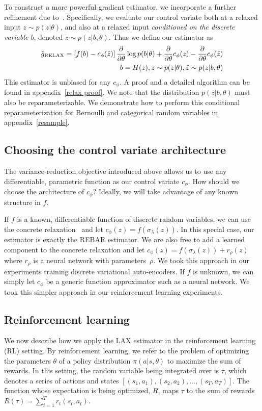 \documentclass{article}
\newcommand{\PT}{\frac{\partial}{\partial \theta}}
\newcommand{\LAX}{{\textnormal{LAX}}}
\begin{document}
To construct a more powerful gradient estimator, we incorporate a further refinement due to~\cite{tucker2017rebar}.
Specifically, we evaluate our control variate both at a relaxed input $z \sim p(z|\theta)$, and also at a relaxed input \emph{conditioned on the discrete variable $b$}, denoted $\tilde z \sim p(z|b, \theta)$. 
Thus we define our estimator as
%
\begin{align}
\hat g_\textnormal{RELAX} = \left[ f(b) - c_\phi(\tilde{z}) \right] \PT \log p(b|\theta) + \PT c_\phi(z) - \PT c_\phi (\tilde{z}) \\
\qquad b = H(z), z \sim p(z|\theta), \tilde{z} \sim p(z|b, \theta) \nonumber
\end{align}
%
This estimator is unbiased for any $c_\phi$.
A proof and a detailed algorithm can be found in appendix~\ref{relax proof}.
%
We note that the distribution $p(z|b,\theta)$ must also be reparameterizable.
We demonstrate how to perform this conditional reparameterization for Bernoulli and categorical random variables in appendix~\ref{resample}.

\subsection{Choosing the control variate architecture}
The variance-reduction objective introduced above allows us to use any differentiable, parametric function as our control variate $c_\phi$. 
How should we choose the architecture of $c_\phi$?
Ideally, we will take advantage of any known structure in $f$.

If $f$ is a known, differentiable function of discrete random variables, we can use the concrete relaxation~\citep{jang2016categorical, maddison2016concrete} and let $c_\phi(z) = f(\sigma_\lambda(z))$.
In this special case, our estimator is exactly the REBAR estimator.
We are also free to add a learned component to the concrete relaxation and let $c_\phi(z) = f(\sigma_\lambda(z)) + {r}_\rho(z)$ where ${r}_\rho$ is a neural network with parameters~$\rho$.
We took this approach in our experiments training discrete variational auto-encoders.
If $f$ is unknown, we can simply let $c_\phi$ be a generic function approximator such as a neural network.
We took this simpler approach in our reinforcement learning experiments.


\subsection{Reinforcement learning}
We now describe how we apply the \LAX{} estimator in the reinforcement learning (RL) setting.
By reinforcement learning, we refer to the problem of optimizing the parameters $\theta$ of a policy distribution $\pi(a | s, \theta)$ to maximize the sum of rewards.
In this setting, the random variable being integrated over is $\tau$, which denotes a series of actions and states $[(s_1, a_1), (s_2, a_2), ..., (s_T, a_T)]$.
The function whose expectation is being optimized, $R$, maps $\tau$ to the sum of rewards ${R(\tau) = \sum_{t=1}^{T} r_t(s_t, a_t)}$.
\end{document}
